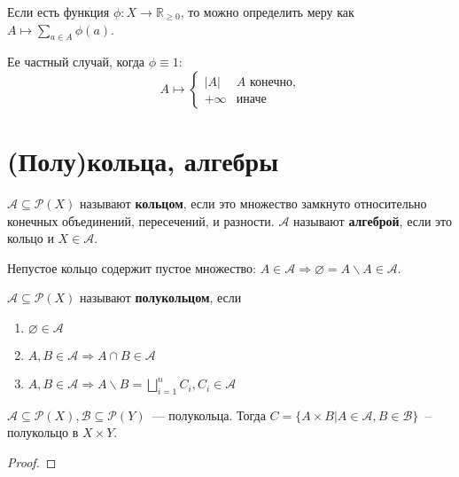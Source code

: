 \begin{example}
	Если есть функция $\phi\colon X\to\mathbb{R}_{\ge0}$, то можно определить меру как $A\mapsto\sum_{a\in A}\phi(a)$.

	Ее частный случай, когда $\phi\equiv 1$:
	$$A\mapsto\begin{cases}
	|A| & A\text{ конечно,}\\
	+\infty &\text{иначе}
	\end{cases}$$
\end{example}
\section{(Полу)кольца, алгебры}
\begin{definition}
	$\mathcal{A}\subseteq\mathcal{P}(X)$ называют {\bf кольцом}, если это множество замкнуто относительно конечных объединений, пересечений, и разности. $\mathcal{A}$ называют {\bf алгеброй}, если это кольцо и $X\in\mathcal{A}$.
\end{definition}
Непустое кольцо содержит пустое множество: $A\in\mathcal{A}\Rightarrow \varnothing=A\smallsetminus A\in\mathcal{A}$.

\begin{definition}
	$\mathcal{A}\subseteq\mathcal{P}(X)$ называют {\bf полукольцом}, если
	\begin{enumerate}
		\item $\varnothing\in\mathcal{A}$
		\item $A,B\in\mathcal{A}\Rightarrow A\cap B\in\mathcal{A}$
		\item $A,B\in\mathcal{A}\Rightarrow A\smallsetminus B=\bigsqcup_{i=1}^n C_i, C_i\in\mathcal{A}$
	\end{enumerate}
\end{definition}

\begin{theorem}
	$\mathcal{A}\subseteq\mathcal{P}(X),\mathcal{B}\subseteq\mathcal{P}(Y)$~--- полукольца. Тогда $C=\{A\times B|A\in\mathcal{A}, B\in\mathcal{B}\}$~-- полукольцо в $X\times Y$.
\end{theorem}
\begin{proof}

\end{proof}
